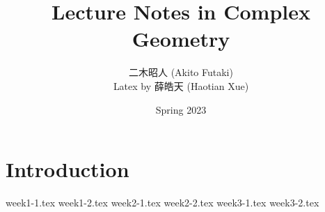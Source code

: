 \documentclass[twoside,12pt]{book}
\title{\Huge Lecture Notes in Complex Geometry}
\author{{\Large 二木昭人} (Akito Futaki)\\
Latex by 薛皓天 (Haotian Xue)}
\date{\Large Spring 2023}
\begin{document}
\maketitle
\frontmatter
\tableofcontents
\newpage
\mainmatter{}

\chapter{Introduction}
{week1-1.tex}
{week1-2.tex}
{week2-1.tex}
{week2-2.tex}
{week3-1.tex}
{week3-2.tex}
\end{document}
